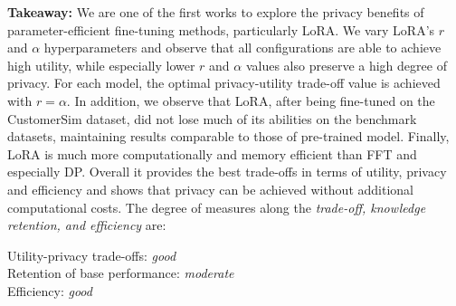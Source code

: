 \noindent
\textbf{Takeaway:}
We are one of the first works to explore the privacy benefits of parameter-efficient fine-tuning methods, particularly LoRA.
We vary LoRA's $r$ and $\alpha$ hyperparameters and observe that all configurations are able to achieve high utility, while especially lower $r$ and $\alpha$ values also preserve a high degree of privacy.
For each model, the optimal privacy-utility trade-off value is achieved with $r = \alpha$.
In addition, we observe that LoRA, after being fine-tuned on the CustomerSim dataset, did not lose much of its abilities on the benchmark datasets, maintaining results comparable to those of pre-trained model.
Finally, LoRA is much more computationally and memory efficient than FFT and especially DP.
Overall it provides the best trade-offs in terms of utility, privacy and efficiency and shows that privacy can be achieved without additional computational costs. The degree of measures along the \textit{trade-off, knowledge retention, and efficiency} are: 

\indent Utility-privacy trade-offs: \textit{good} \\
\indent Retention of base performance: \textit{moderate} \\
\indent Efficiency: \textit{good}